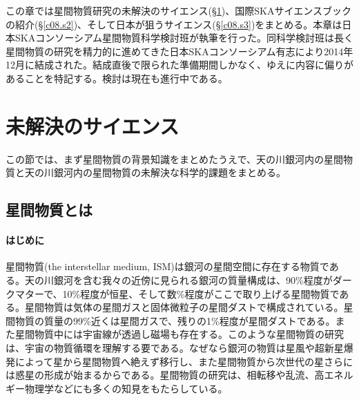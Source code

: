 

この章では星間物質研究の未解決のサイエンス(\S \ref{c08.s1})、国際SKAサイエンスブックの紹介(\S \ref{c08.s2})、そして日本が狙うサイエンス(\S \ref{c08.s3})をまとめる。本章は日本SKAコンソーシアム星間物質科学検討班が執筆を行った。同科学検討班は長く星間物質の研究を精力的に進めてきた日本SKAコンソーシアム有志により2014年12月に結成された。結成直後で限られた準備期間しかなく、ゆえに内容に偏りがあることを特記する。検討は現在も進行中である。

\setcounter{section}{0}\section{未解決のサイエンス}
\label{c08.s1}

この節では、まず星間物質の背景知識をまとめたうえで、天の川銀河内の星間物質と天の川銀河内の星間物質の未解決な科学的課題をまとめる。

\subsection{星間物質とは}
\label{c08.s1.ss1}

\paragraph{はじめに}

星間物質(the interstellar medium, ISM)は銀河の星間空間に存在する物質である。天の川銀河を含む我々の近傍に見られる銀河の質量構成は、90\%程度がダークマターで、10\%程度が恒星、そして数\%程度がここで取り上げる星間物質である。星間物質は気体の星間ガスと固体微粒子の星間ダストで構成されている。星間物質の質量の99\%近くは星間ガスで、残りの1\%程度が星間ダストである。また星間物質中には宇宙線が透過し磁場も存在する。このような星間物質の研究は、宇宙の物質循環を理解する要である。なぜなら銀河の物質は星風や超新星爆発によって星から星間物質へ絶えず移行し、また星間物質から次世代の星さらには惑星の形成が始まるからである。星間物質の研究は、相転移や乱流、高エネルギー物理学などにも多くの知見をもたらしている。


